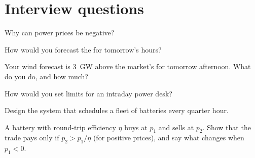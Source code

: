 \section{Interview questions}

\begin{interviewq}\label{iq:s2:power-and-gas-trading:1}
Why can power prices be negative?
\end{interviewq}

\begin{interviewq}\label{iq:s2:power-and-gas-trading:2}
How would you forecast the  for tomorrow's hours?
\end{interviewq}

\begin{interviewq}\label{iq:s2:power-and-gas-trading:3}
Your wind forecast is 3~GW above the market's for tomorrow afternoon. What do you do, and how much?
\end{interviewq}

\begin{interviewq}\label{iq:s2:power-and-gas-trading:4}
How would you set limits for an intraday power desk?
\end{interviewq}

\begin{interviewq}\label{iq:s2:power-and-gas-trading:5}
Design the system that schedules a fleet of batteries every quarter hour.
\end{interviewq}

\begin{interviewq}\label{iq:s2:power-and-gas-trading:6}
A battery with round-trip efficiency $\eta$ buys at $p_1$ and sells at $p_2$. Show that the trade pays only if $p_2 > p_1/\eta$ (for positive
prices), and say what changes when $p_1 < 0$.
\end{interviewq}
